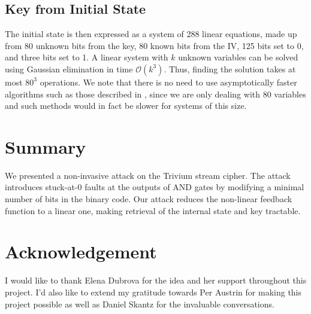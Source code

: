 \documentclass[conference]{IEEEtran}
\begin{document}
\subsection{Key from Initial State}

The initial state is then expressed as a system of 288 linear equations, made up from 80 unknown bits from the key, 80 known bits from the IV, 125 bits set to 0, and three bits set to 1. A linear system with $k$ unknown variables can be solved using Gaussian elimination in time $\mathcal{O}(k^3)$. Thus, finding the solution takes at most $80^{3}$ operations. We note that there is no need to use asymptotically faster algorithms such as those described in \cite{gauss}, since we are only dealing with 80 variables and such methods would in fact be slower for systems of this size.
 
\section{Summary}

We presented a non-invasive attack on the Trivium stream cipher. The attack introduces stuck-at-0 faults at the outputs of AND gates by modifying a minimal number of bits in the binary code. Our attack reduces the non-linear feedback function to a linear one, making retrieval of the internal state and key tractable.

\section*{Acknowledgement}

I would like to thank Elena Dubrova for the idea and her support throughout this project. I'd also like to extend my gratitude towards Per Austrin for making this project possible as well as Daniel Skantz for the invaluable conversations.



\nocite{*}
\end{document}
